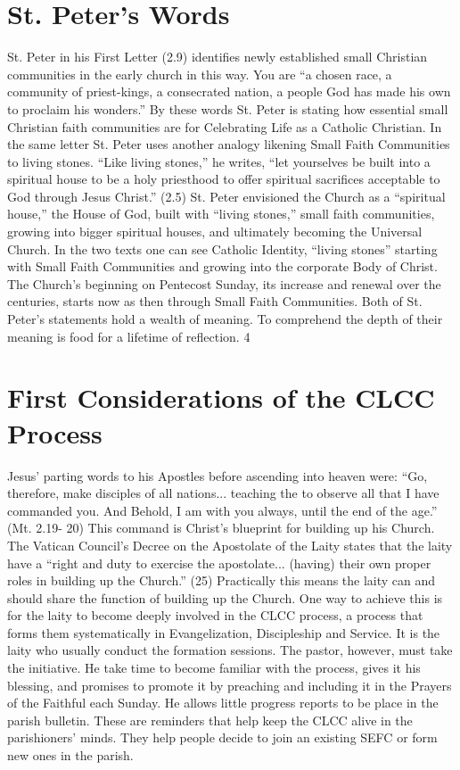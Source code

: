 \documentclass{article}
\begin{document}
\section{St. Peter's Words}

St. Peter in his First Letter (2.9) identifies newly established small Christian
communities in the early church in this way. You are ``a chosen race, a
community of priest-kings, a consecrated nation, a people God has made his own
to proclaim his wonders.'' By these words St. Peter is stating how essential
small Christian faith communities are for Celebrating Life as a Catholic
Christian.
In the same letter St. Peter uses another analogy likening Small Faith
Communities to living stones. ``Like living stones,'' he writes, ``let
yourselves be built into a spiritual house to be a holy priesthood to offer
spiritual sacrifices acceptable to God through Jesus Christ.'' (2.5) St. Peter
envisioned the Church as a ``spiritual house,'' the House of God, built with
``living stones,'' small faith communities, growing into bigger spiritual
houses, and ultimately becoming the Universal Church. In the two texts one can
see Catholic Identity, ``living stones'' starting with Small Faith Communities
and growing into the corporate Body of Christ. The Church's beginning on
Pentecost Sunday, its increase and renewal over the centuries, starts now as
then through Small Faith Communities. Both of St. Peter's statements hold a
wealth of meaning. To comprehend the depth of their meaning is food for a
lifetime of reflection.
4

\section{First Considerations of the CLCC Process}

Jesus' parting words to his Apostles before ascending into heaven were: ``Go,
therefore, make disciples of all nations... teaching the to observe all that I
have commanded you. And Behold, I am with you always, until the end of the
age.'' (Mt. 2.19- 20) This command is Christ's blueprint for building up his
Church. The Vatican Council's Decree on the Apostolate of the Laity states that
the laity have a ``right and duty to exercise the apostolate... (having) their
own proper roles in building up the Church.'' (25) Practically this means the
laity can and should share the function of building up the Church. One way to
achieve this is for the laity to become deeply involved in the CLCC process, a
process that forms them systematically in Evangelization, Discipleship and
Service.
It is the laity who usually conduct the formation sessions. The pastor, however,
must take the initiative. He take time to become familiar with the process,
gives it his blessing, and promises to promote it by preaching and including it
in the Prayers of the Faithful each Sunday. He allows little progress reports to
be place in the parish bulletin. These are reminders that help keep the CLCC
alive in the parishioners' minds. They help people decide to join an existing
SEFC or form new ones in the parish.
\end{document}

